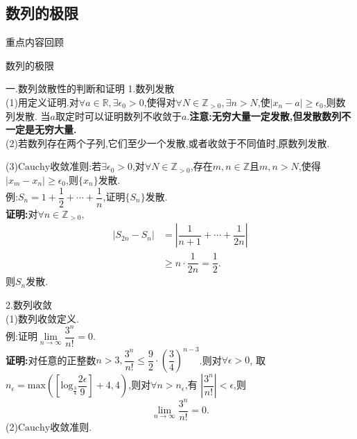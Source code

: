 \documentclass[UTF8]{ctexbeamer}
\begin{document}
    \subsection{数列的极限}
    \begin{frame}
        \begin{block}{\begin{center}重点内容回顾\end{center}}
            \begin{center}
                \Huge{数列的极限}
            \end{center}
        \end{block}
    \end{frame}
    \begin{frame}{一.数列敛散性的判断和证明}
        1.数列发散
        \\(1)用定义证明.对$\forall a\in\mathbb{R},\exists \epsilon_0>0$,使得对$\forall N\in\mathbb{Z}_{>0},\exists n>N$,使$|x_n-a|\geqslant \epsilon_0$,则数列发散.
        当$a$取定时可以证明数列不收敛于$a$.\textbf{注意:无穷大量一定发散,但发散数列不一定是无穷大量.}
        \\(2)若数列存在两个子列,它们至少一个发散,或者收敛于不同值时,原数列发散.
    \end{frame}
    \begin{frame}
        (3)$\mathrm{Cauchy}$收敛准则:若$\exists\epsilon_0>0$,对$\forall N\in\mathbb{Z}_{>0}$,存在$m,n\in\mathbb{Z}$且$m,n>N$,使得$|x_m-x_n|\geqslant \epsilon_0$,则$\{x_n\}$发散.
        \\例:$S_n=1+\dfrac{1}{2}+\cdots+\dfrac{1}{n}$,证明$\{S_n\}$发散.
        \pause
        \\\textbf{证明:}对$\forall n\in \mathbb{Z}_{>0},$
        \[\begin{aligned}
            |S_{2n}-S_n|&=\left|\dfrac{1}{n+1}+\cdots+\dfrac{1}{2n}\right|\\
            &\geqslant n\cdot\dfrac{1}{2n}=\dfrac{1}{2}.
        \end{aligned}\]
        则${S_n}$发散.
    \end{frame}
    \begin{frame}
        2.数列收敛
        \\(1)数列收敛定义.
        \\例:证明$\lim\limits_{n\to\infty}\dfrac{3^n}{n!}=0$.
        \pause
        \\\textbf{证明:}对任意的正整数$n>3,\dfrac{3^n}{n!}\leqslant \dfrac{9}{2}\cdot \left(\dfrac{3}{4}\right)^{n-3}$.则对$\forall\epsilon>0$,
        取$n_\epsilon=\mathrm{max}\left(\left[\mathrm{log}_{\frac{3}{4}}\dfrac{2\epsilon}{9}\right]+4,4\right)$,则对$\forall n>n_\epsilon$,有
        $\left|\dfrac{3^n}{n!}\right|<\epsilon$,则$$\lim\limits_{n\to\infty}\dfrac{3^n}{n!}=0.$$
        (2)$\mathrm{Cauchy}$收敛准则.
    \end{frame}
\end{document}
